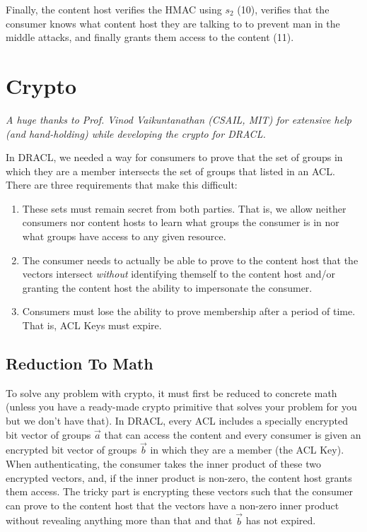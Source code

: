 \documentclass[pdftex,12pt,a4papaer,twoside,notitlepage]{report}
\begin{document}
Finally, the content host verifies the HMAC using $s_2$ (10), verifies that the
consumer knows what content host they are talking to to prevent man in the
middle attacks, and finally grants them access to the content (11).


\chapter{Crypto}
\label{chap:crypto}

\textit{A huge thanks to Prof. Vinod Vaikuntanathan (CSAIL, MIT) for extensive
  help (and hand-holding) while developing the crypto for DRACL.}

In DRACL, we needed a way for consumers to prove that the set of groups in which
they are a member intersects the set of groups that listed in an ACL. There are
three requirements that make this difficult:

\begin{enumerate}
\item These sets must remain secret from both parties. That is, we allow neither
  consumers nor content hosts to learn what groups the consumer is in nor what
  groups have access to any given resource.
\item The consumer needs to actually be able to prove to the content host that
  the vectors intersect \emph{without} identifying themself to the content host
  and/or granting the content host the ability to impersonate the consumer.
\item Consumers must lose the ability to prove membership after a period of
  time. That is, ACL Keys must expire.
\end{enumerate}

\section{Reduction To Math}
\label{sec:reduce-to-math}

To solve any problem with crypto, it must first be reduced to concrete math
(unless you have a ready-made crypto primitive that solves your problem for you
but we don't have that). In DRACL, every ACL includes a specially encrypted bit
vector of groups $\vec{a}$ that can access the content and every consumer is
given an encrypted bit vector of groups $\vec{b}$ in which they are a member
(the ACL Key). When authenticating, the consumer takes the inner product of
these two encrypted vectors, and, if the inner product is non-zero, the content
host grants them access. The tricky part is encrypting these vectors such that
the consumer can prove to the content host that the vectors have a non-zero
inner product without revealing anything more than that and that $\vec{b}$ has
not expired.
\end{document}
